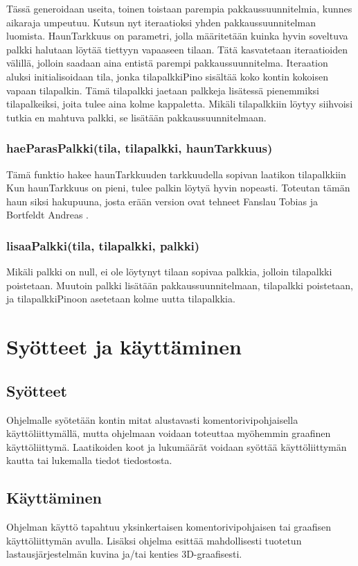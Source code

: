 \documentclass[a4paper,12pt, titlepage]{article}
\begin{document}
\noindent
Tässä generoidaan useita, toinen toistaan parempia pakkaussuunnitelmia, kunnes aikaraja umpeutuu. Kutsun nyt iteraatioksi yhden pakkaussuunnitelman luomista. HaunTarkkuus on parametri, jolla määritetään kuinka hyvin soveltuva palkki halutaan löytää tiettyyn vapaaseen tilaan. Tätä kasvatetaan iteraatioiden välillä, jolloin saadaan aina entistä parempi pakkaussuunnitelma. Iteraation aluksi initialisoidaan tila, jonka tilapalkkiPino sisältää koko kontin kokoisen vapaan tilapalkin. Tämä tilapalkki jaetaan palkkeja lisätessä pienemmiksi tilapalkeiksi, joita tulee aina kolme kappaletta. Mikäli tilapalkkiin löytyy siihvoisi tutkia en mahtuva palkki, se lisätään pakkaussuunnitelmaan.

\subsubsection*{haeParasPalkki(tila, tilapalkki, haunTarkkuus)}
Tämä funktio hakee haunTarkkuuden tarkkuudella sopivan laatikon tilapalkkiin Kun haunTarkkuus on pieni, tulee palkin löytyä hyvin nopeasti. Toteutan tämän haun siksi hakupuuna, josta erään version ovat tehneet Fanslau Tobias ja Bortfeldt Andreas \cite{fanslau-bortfeldt}.

\subsubsection*{lisaaPalkki(tila, tilapalkki, palkki)}
Mikäli palkki on null, ei ole löytynyt tilaan sopivaa palkkia, jolloin tilapalkki poistetaan. Muutoin palkki lisätään pakkaussuunnitelmaan, tilapalkki poistetaan, ja tilapalkkiPinoon asetetaan kolme uutta tilapalkkia.

\section*{Syötteet ja käyttäminen}
\subsection*{Syötteet}
Ohjelmalle syötetään kontin mitat alustavasti komentorivipohjaisella käyttöliittymällä, mutta ohjelmaan voidaan toteuttaa myöhemmin graafinen käyttöliittymä. Laatikoiden koot ja lukumäärät voidaan syöttää käyttöliittymän kautta tai lukemalla tiedot tiedostosta.

\subsection*{Käyttäminen}
Ohjelman käyttö tapahtuu yksinkertaisen komentorivipohjaisen tai graafisen käyttöliittymän avulla. Lisäksi ohjelma esittää mahdollisesti tuotetun lastausjärjestelmän kuvina ja/tai kenties 3D-graafisesti.
\end{document}
